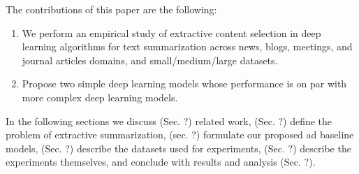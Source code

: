 The contributions of this paper are the following:
\begin{enumerate}
    \item We perform an empirical study of extractive content selection in 
        deep learning 
        algorithms for text summarization across news, blogs, meetings, and
         journal articles domains, and small/medium/large datasets.
    \item Propose two simple deep learning models whose performance is on par 
          with more complex deep learning models.
\end{enumerate}
In the following sections we discuss 
(Sec. ?) related work, 
(Sec. ?) define the problem of extractive summarization, 
(sec. ?) formulate our proposed ad baseline models,
(Sec. ?) describe the datasets used for experiments,
(Sec. ?) describe the experiments themselves, and conclude with 
results and analysis (Sec. ?).

